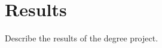 \documentclass[../main.tex]{subfiles}
\begin{document}
\chapter{Results}
Describe the results of the degree project.
\end{document}
